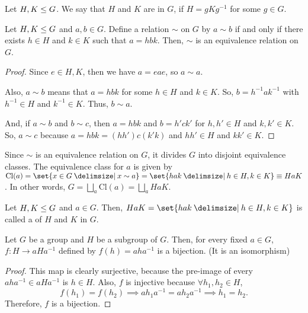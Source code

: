 \documentclass[11pt]{penrose}
\begin{document}
\begin{ndfn}
    Let $H, K \mathrel{\leq} G$. We say that $H$ and $K$ are  in $G$, if $H = g K g^{-1}$ for some $g \in G$.
\end{ndfn}

\begin{nprop}
    Let $H, K \mathrel{\leq} G$ and $a, b \in G$. Define a relation $\sim$ on $G$ by $a \sim b$ if and only if there exists $h \in H$ and $k \in K$ such that $a = hbk$. Then, $\sim$ is an equivalence relation on $G$.
\end{nprop}
\begin{proof}
    Since $e \in H, K$, then we have $a = e a e$, so $a \sim a$.

    Also, $a \sim b$ means that $a = hbk$ for some $h \in H$ and $k \in K$. So, $b = h^{-1} a k^{-1}$ with $h^{-1} \in H$ and $k^{-1} \in K$. Thus, $b \sim a$.

    And, if $a \sim b$ and $b \sim c$, then $a = hbk$ and $b = h'ck'$ for $h, h' \in H$ and $k, k' \in K$. So, $a \sim c$ because $a = h b k = (h h') c (k' k)$ and $hh' \in H$ and $kk' \in K$.
\end{proof}

\begin{remark}
    Since $\sim$ is an equivalence relation on $G$, it divides $G$ into disjoint equivalence classes. The equivalence class for $a$ is given by $\mathrm{Cl}(a) = \set{x \in G \st x \sim a} = \set{hak \st h \in H, k \in K} \equiv HaK$. In other words, $\displaystyle G = \bigsqcup_{a} \mathrm{Cl}(a) = \bigsqcup_{a} HaK$.

\end{remark}

\begin{ndfn}
    Let $H, K \mathrel{\leq} G$ and $a \in G$. Then, $HaK = \set{hak \st h \in H, k \in K}$ is called a  of $H$ and $K$ in $G$.
\end{ndfn}

\begin{nlemma}
    Let $G$ be a group and $H$ be a subgroup of $G$. Then, for every fixed $a \in G$, $f : H \to a H a^{-1}$ defined by $f(h) = aha^{-1}$ is a bijection. (It is an isomorphism)
\end{nlemma}
\begin{proof}
    This map is clearly surjective, because the pre-image of every $aha^{-1} \in aHa^{-1}$ is $h \in H$. Also, $f$ is injective because $\forall h_{1}, h_{2} \in H$,
    \begin{equation*}
        f(h_{1}) = f(h_{2}) \implies ah_{1}a^{-1} = ah_{2}a^{-1} \implies h_{1} = h_{2}.
    \end{equation*}
    Therefore, $f$ is a bijection.
\end{proof}
\end{document}
